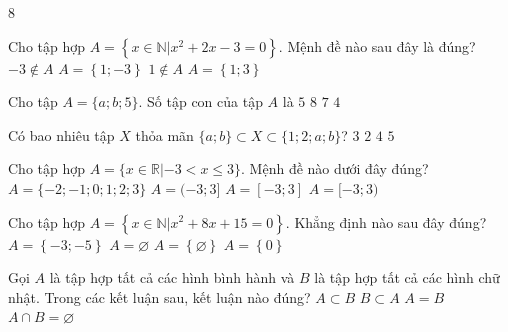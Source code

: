 \begin{indapan}{8}
\begin{ex}%
	Cho tập hợp $A=\left\{ x \in \mathbb{N}| x^2+2x-3=0 \right\}$. Mệnh đề nào sau đây là đúng?
	\choice
	{\True $-3 \notin A$}
	{$A=\left\{1;-3\right\}$}
	{$1 \notin A$}
	{$A=\left\{1;3\right\}$}
\end{ex}
\begin{ex}%
	Cho tập $A=\{a;b;5\}$. Số tập con của tập $A$ là
	\choice
	{$5$}
	{\True $8$}
	{$7$}
	{$4$}
\end{ex}
\begin{ex}%
	Có bao nhiêu tập $ X $ thỏa mãn $ \{a;b\} \subset X \subset \{1;2;a;b\}$?
	\choice
	{$3$}
	{$2$}
	{\True $4$}
	{$5$}
\end{ex}
\begin{ex}%
	Cho tập hợp $A=\{x\in\mathbb{R}|-3<x\le 3\}$. Mệnh đề nào dưới đây đúng?
	\choice
	{$A=\{-2;-1;0;1;2;3\}$}
	{\True $A=(-3;3]$}
	{$A=[-3;3]$}
	{$A=[-3;3)$}
	\loigiai{
		Từ giả thiết, có $A=(-3;3]$.
	}
\end{ex}
\begin{ex}%
	Cho tập hợp $A = \left\{x \in \mathbb{N}\big| x^2 + 8x + 15 = 0\right\}$. Khẳng định nào sau đây đúng?
	\choice
	{$A = \left\{-3;-5\right\}$}
	{\True $A =\varnothing$}
	{$A = \left\{\varnothing\right\}$}
	{$A = \left\{0\right\}$}
\end{ex}
\begin{ex}%
	Gọi $A$ là tập hợp tất cả các hình bình hành và $B$ là tập hợp tất cả các hình chữ nhật. Trong các kết luận sau, kết luận nào đúng?
	\choice
	{$A \subset B$}
	{\True $B \subset A$}
	{$A=B$}
	{$A \cap B=\varnothing$}
\end{ex}


\end{indapan}
